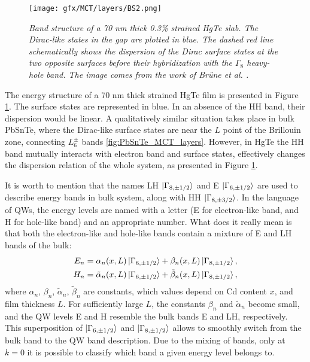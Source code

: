 \documentclass[titlepage,a4paper]{book}
\begin{document}
\begin{figure}[ht]
	\centering
	\texttt{[image: gfx/MCT/layers/BS2.png]}
	\vspace{-10pt}
	\caption{\textit{Band structure of a 70 nm thick 0.3\% strained HgTe slab. The Dirac-like states in the gap are plotted in blue. The dashed red line schematically shows the dispersion of the Dirac surface states at the two opposite surfaces before their hybridization with the $\Gamma_8$ heavy-hole band. The image comes from the work of Brüne \textit{et al.} \cite{Brune_State2}.}}
	\label{fig:BS_MCT_layers}
\end{figure} 

The energy structure of a 70 nm thick strained HgTe film is presented in Figure \ref{fig:BS_MCT_layers}. The surface states are represented in blue. In an absence of the HH band, their dispersion would be linear. A qualitatively similar situation takes place in bulk PbSnTe, where the Dirac-like surface states are near the $L$ point of the Brillouin zone, connecting $L_6^{\pm}$ bands \ref{fig:PbSnTe_MCT_layers}. However, in HgTe the HH band mutually interacts with electron band and surface states, effectively changes the dispersion relation of the whole system, as presented in Figure \ref{fig:BS_MCT_layers}. 

It is worth to mention that the names LH $\ket{\Gamma_{8, \pm 1/2}}$ and E $\ket{\Gamma_{6, \pm 1/2}}$ are used to describe energy bands in bulk system, along with HH $\ket{\Gamma_{8, \pm 3/2}}$. In the language of QWs, the energy levels are named with a letter (E for electron-like band, and H for hole-like band) and an appropriate number. What does it really mean is that both the electron-like and hole-like bands contain a mixture of E and LH bands of the bulk:
\begin{equation}
\label{MCT_layers_levels}
\begin{aligned}
E_n = \alpha_n(x, L) \ket{\Gamma_{6, \pm 1/2}}+\beta_n(x, L) \ket{\Gamma_{8, \pm 1/2}},\\
H_n = \tilde{\alpha}_n(x, L) \ket{\Gamma_{6, \pm 1/2}}+\tilde{\beta}_n(x, L) \ket{\Gamma_{8, \pm 1/2}},
\end{aligned}
\end{equation}
where $\alpha_n$, $\beta_n$, $\tilde{\alpha}_n$, $\tilde{\beta}_n$ are constants, which values depend on Cd content $x$, and film thickness $L$. For sufficiently large $L$, the constants $\beta_n$ and $\tilde{\alpha}_n$ become small, and the QW levels E and H resemble the bulk bands E and LH, respectively. This superposition of $\ket{\Gamma_{6, \pm 1/2}}$ and $\ket{\Gamma_{8, \pm 1/2}}$ allows to smoothly switch from the bulk band to the QW band description. Due to the mixing of bands, only at $k = 0$ it is possible to classify which band a given energy level belongs to.
\end{document}
